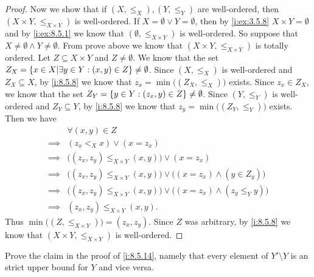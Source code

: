 \begin{proof}
  Now we show that if \((X, \leq_X), (Y, \leq_Y)\) are well-ordered, then \((X \times Y, \leq_{X \times Y})\) is well-ordered.
  If \(X = \emptyset \lor Y = \emptyset\), then by \cref{i:ex:3.5.8} \(X \times Y = \emptyset\) and by \cref{i:ex:8.5.1} we know that \((\emptyset, \leq_{X \times Y})\) is well-ordered.
  So suppose that \(X \neq \emptyset \land Y \neq \emptyset\).
  From prove above we know that \((X \times Y, \leq_{X \times Y})\) is totally ordered.
  Let \(Z \subseteq X \times Y\) and \(Z \neq \emptyset\).
  We know that the set \(Z_X = \left\lbrace x \in X | \exists y \in Y : (x, y) \in Z\right\rbrace \neq \emptyset\).
  Since \((X, \leq_X)\) is well-ordered and \(Z_X \subseteq X\), by \cref{i:8.5.8} we know that \(z_x = \min\big((Z_X, \leq_X)\big)\) exists.
  Since \(z_x \in Z_X\), we know that the set \(Z_Y = \left\lbrace y \in Y : (z_x, y) \in Z\right\rbrace \neq \emptyset\).
  Since \((Y, \leq_Y)\) is well-ordered and \(Z_Y \subseteq Y\), by \cref{i:8.5.8} we know that \(z_y = \min\big((Z_Y, \leq_Y)\big)\) exists.
  Then we have
  \begin{align*}
             & \forall (x, y) \in Z                                                                        \\
    \implies & (z_x <_X x) \lor (x = z_x)                                                                  \\
    \implies & \big((z_x, z_y) \leq_{X \times Y} (x, y)\big) \lor (x = z_x)                                \\
    \implies & \big((z_x, z_y) \leq_{X \times Y} (x, y)\big) \lor \big((x = z_x) \land (y \in Z_y)\big)    \\
    \implies & \big((z_x, z_y) \leq_{X \times Y} (x, y)\big) \lor \big((x = z_x) \land (z_y \leq_Y y)\big) \\
    \implies & (z_x, z_y) \leq_{X \times Y} (x, y).
  \end{align*}
  Thus \(\min\big((Z, \leq_{X \times Y})\big) = (z_x, z_y)\).
  Since \(Z\) was arbitrary, by \cref{i:8.5.8} we know that \((X \times Y, \leq_{X \times Y})\) is well-ordered.
\end{proof}

\begin{ex}\label{i:ex:8.5.13}
  Prove the claim in the proof of \cref{i:8.5.14}, namely that every element of \(Y' \setminus Y\) is an strict upper bound for \(Y\) and vice versa.
\end{ex}

